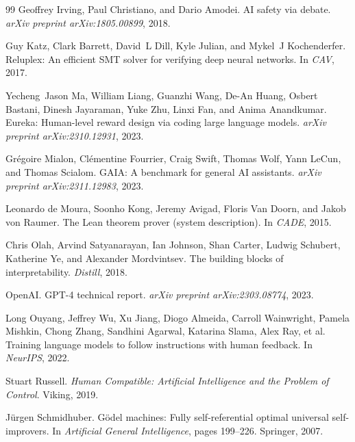 \documentclass[11pt,letterpaper]{article}
\begin{document}
\begin{thebibliography}{99}
Geoffrey Irving, Paul Christiano, and Dario Amodei.
\newblock AI safety via debate.
\newblock \emph{arXiv preprint arXiv:1805.00899}, 2018.

Guy Katz, Clark Barrett, David~L Dill, Kyle Julian, and Mykel~J Kochenderfer.
\newblock Reluplex: An efficient SMT solver for verifying deep neural networks.
\newblock In \emph{CAV}, 2017.

Yecheng~Jason Ma, William Liang, Guanzhi Wang, De-An Huang, Osbert Bastani, Dinesh Jayaraman, Yuke Zhu, Linxi Fan, and Anima Anandkumar.
\newblock Eureka: Human-level reward design via coding large language models.
\newblock \emph{arXiv preprint arXiv:2310.12931}, 2023.

Grégoire Mialon, Clémentine Fourrier, Craig Swift, Thomas Wolf, Yann LeCun, and Thomas Scialom.
\newblock GAIA: A benchmark for general AI assistants.
\newblock \emph{arXiv preprint arXiv:2311.12983}, 2023.

Leonardo de Moura, Soonho Kong, Jeremy Avigad, Floris Van Doorn, and Jakob von Raumer.
\newblock The Lean theorem prover (system description).
\newblock In \emph{CADE}, 2015.

Chris Olah, Arvind Satyanarayan, Ian Johnson, Shan Carter, Ludwig Schubert, Katherine Ye, and Alexander Mordvintsev.
\newblock The building blocks of interpretability.
\newblock \emph{Distill}, 2018.

OpenAI.
\newblock GPT-4 technical report.
\newblock \emph{arXiv preprint arXiv:2303.08774}, 2023.

Long Ouyang, Jeffrey Wu, Xu Jiang, Diogo Almeida, Carroll Wainwright, Pamela Mishkin, Chong Zhang, Sandhini Agarwal, Katarina Slama, Alex Ray, et al.
\newblock Training language models to follow instructions with human feedback.
\newblock In \emph{NeurIPS}, 2022.

Stuart Russell.
\newblock \emph{Human Compatible: Artificial Intelligence and the Problem of Control}.
\newblock Viking, 2019.

Jürgen Schmidhuber.
\newblock Gödel machines: Fully self-referential optimal universal self-improvers.
\newblock In \emph{Artificial General Intelligence}, pages 199--226. Springer, 2007.


\end{thebibliography}
\end{document}
